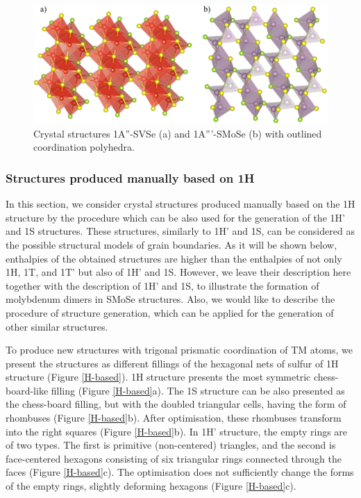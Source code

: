\documentclass[a4paperm]{article}
\begin{document}
\begin{figure}[H]
	\includegraphics[width=\textwidth]{airss3_poly.png}
	\caption{Crystal structures 1A''-SVSe (a) and 1A'''-SMoSe (b) with outlined coordination polyhedra.}
	\label{airss3_poly}
\end{figure}




\subsubsection{Structures produced manually based on 1H}

In this section, we consider crystal structures produced manually based on the 1H structure by the procedure which can be also used for the generation of the 1H' and 1S structures.
These structures, similarly to 1H' and 1S, can be considered as the possible structural models of grain boundaries.
As it will be shown below, enthalpies of the obtained structures are higher than the enthalpies of not only 1H, 1T, and 1T' but also of 1H' and 1S.
However, we leave their description here together with the description of 1H' and 1S, to illustrate the formation of molybdenum dimers in SMoSe structures.
Also, we would like to describe the procedure of structure generation, which can be applied for the generation of other similar structures.

To produce new structures with trigonal prismatic coordination of TM atoms, we present the structures as different fillings of the hexagonal nets of sulfur of 1H structure (Figure \ref{H-based}).
1H structure presents the most symmetric chess-board-like filling (Figure \ref{H-based}a).
The 1S structure can be also presented as the chess-board filling, but with the doubled triangular cells, having the form of rhombuses (Figure \ref{H-based}b).
After optimisation, these rhombuses transform into the right squares (Figure \ref{H-based}b).
In 1H' structure, the empty rings are of two types.
The first is primitive (non-centered) triangles, and the second is face-centered hexagons consisting of six triangular rings connected through the faces (Figure \ref{H-based}c).
The optimisation does not sufficiently change the forms of the empty rings, slightly deforming hexagons (Figure \ref{H-based}c).
\end{document}
